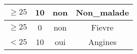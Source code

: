 \documentclass[a4paper, 11pt]{report}
\begin{document}
\begin{itemize}
\begin{center}
\begin{tabular}{| c | c | c | c |}
$\ge 25$ & 10 & non & Non\_malade\\
\hline

$\ge 25$ & 0 & non & Fievre\\
\hline

$<25$ & 10 & oui & Angines\\
\hline
\end{tabular}
\end{center}



\end{itemize}
\end{document}
